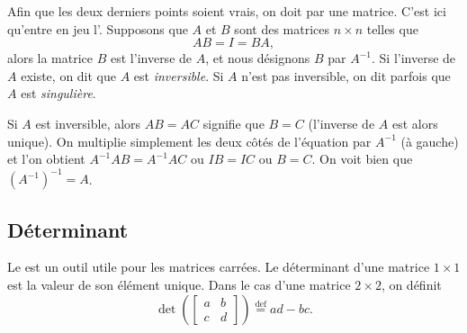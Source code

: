 Afin que les deux derniers points soient vrais, on doit  par une matrice. C'est ici qu'entre en jeu l'\emph{}. Supposons que $A$ et $B$ sont des matrices $n \times n$ telles que
\begin{equation*}
AB = I = BA ,
\end{equation*}
alors la matrice $B$ est l'inverse de $A$, et nous désignons $B$ par $A^{-1}$.
Si l'inverse de $A$ existe, on dit que $A$ est
\emph{inversible}.
Si $A$ n'est pas inversible, on dit parfois que $A$ est
\emph{singulière}.

Si $A$ est inversible, alors $AB = AC$ signifie que
$B = C$ (l'inverse de $A$ est alors unique).
On multiplie simplement les deux côtés de l'équation par $A^{-1}$ (à gauche) et l'on obtient
$A^{-1}AB = A^{-1}AC$ ou $IB=IC$ ou $B=C$.
On voit bien que ${(A^{-1})}^{-1} = A$.

\subsection{Déterminant}

Le \emph{} est un outil utile pour les matrices carrées. Le déterminant d'une matrice $1 \times 1$ est la valeur de son élément unique. Dans le cas d'une matrice $2 \times 2$, on définit
\begin{equation*}
\det \left(
\begin{bmatrix}
a & b \\
c & d
\end{bmatrix}
\right)
\overset{\text{def}}{=}
ad-bc .
\end{equation*}

